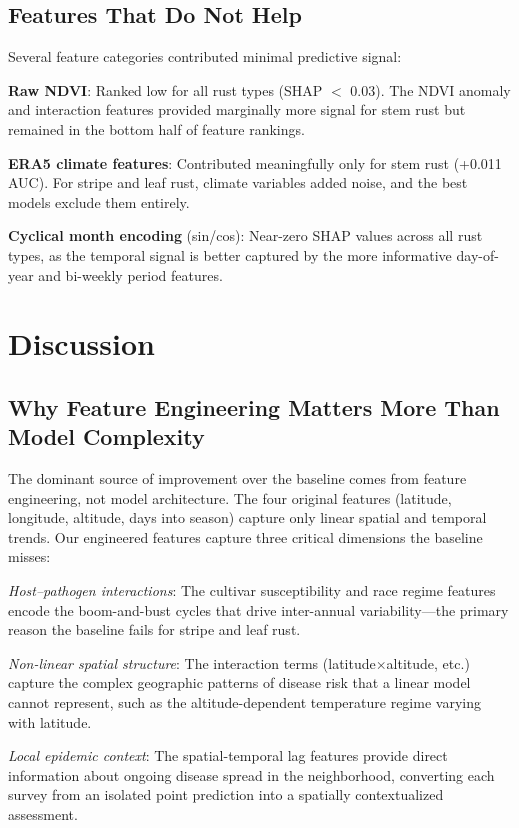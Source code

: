 \documentclass[10pt,twocolumn,letterpaper]{article}
\begin{document}
\subsection{Features That Do Not Help}

Several feature categories contributed minimal predictive signal:

\noindent\textbf{Raw NDVI}: Ranked low for all rust types (SHAP $<$ 0.03). The NDVI anomaly and interaction features provided marginally more signal for stem rust but remained in the bottom half of feature rankings.

\noindent\textbf{ERA5 climate features}: Contributed meaningfully only for stem rust (+0.011 AUC). For stripe and leaf rust, climate variables added noise, and the best models exclude them entirely.

\noindent\textbf{Cyclical month encoding} (sin/cos): Near-zero SHAP values across all rust types, as the temporal signal is better captured by the more informative day-of-year and bi-weekly period features.

\section{Discussion}
\label{sec:discussion}

\subsection{Why Feature Engineering Matters More Than Model Complexity}

The dominant source of improvement over the baseline comes from feature engineering, not model architecture. The four original features (latitude, longitude, altitude, days into season) capture only linear spatial and temporal trends. Our engineered features capture three critical dimensions the baseline misses:

\textit{Host--pathogen interactions}: The cultivar susceptibility and race regime features encode the boom-and-bust cycles that drive inter-annual variability---the primary reason the baseline fails for stripe and leaf rust.

\textit{Non-linear spatial structure}: The interaction terms (latitude$\times$altitude, etc.) capture the complex geographic patterns of disease risk that a linear model cannot represent, such as the altitude-dependent temperature regime varying with latitude.

\textit{Local epidemic context}: The spatial-temporal lag features provide direct information about ongoing disease spread in the neighborhood, converting each survey from an isolated point prediction into a spatially contextualized assessment.
\end{document}
